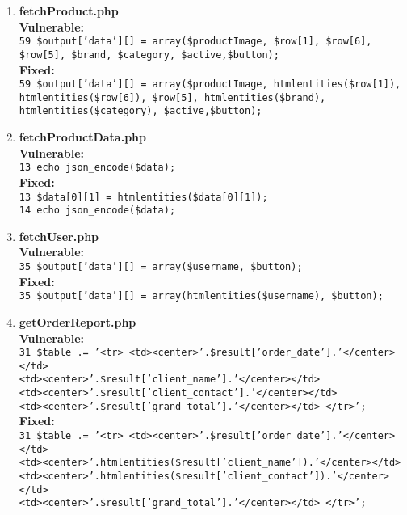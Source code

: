 \documentclass[11pt]{article}
\begin{document}
\begin{enumerate}
	\item \textbf{fetchProduct.php} \\
	\textbf{Vulnerable:} \\ 
		\texttt{59 \$output['data'][] = array(\$productImage, \$row[1], \$row[6], \$row[5],
		\$brand, \$category, \$active,\$button);} \\
	\textbf{Fixed:} \\
		\texttt{59 \$output['data'][] = array(\$productImage, htmlentities(\$row[1]), htmlentities(\$row[6]), \$row[5], htmlentities(\$brand), htmlentities(\$category), \$active,\$button);} \\



\newpage
	\item \textbf{fetchProductData.php} \\
	\textbf{Vulnerable:} \\ 
		\texttt{13 echo json\_encode(\$data);} \\
	\textbf{Fixed:} \\
		\texttt{13 \$data[0][1] = htmlentities(\$data[0][1]);} \\
		\texttt{14 echo json\_encode(\$data);} \\

	\item \textbf{fetchUser.php} \\
	\textbf{Vulnerable:} \\ 
		\texttt{35 \$output['data'][] = array(\$username, \$button);} \\
	\textbf{Fixed:} \\
		\texttt{35 \$output['data'][] = array(htmlentities(\$username), \$button);} \\

	\item \textbf{getOrderReport.php} \\
	\textbf{Vulnerable:} \\ 
		\texttt{31 \$table .= '<tr>
        <td><center>'.\$result['order\_date'].'</center></td>} \\
        \texttt{<td><center>'.\$result['client\_name'].'</center></td>} \\
        \texttt{<td><center>'.\$result['client\_contact'].'</center></td>} \\
        \texttt{<td><center>'.\$result['grand\_total'].'</center></td>
      </tr>';}\\
	\textbf{Fixed:} \\
		\texttt{31 \$table .= '<tr>
        <td><center>'.\$result['order\_date'].'</center></td>} \\
        \texttt{<td><center>'.htmlentities(\$result['client\_name']).'</center></td>} \\
        \texttt{<td><center>'.htmlentities(\$result['client\_contact']).'</center></td>} \\
        \texttt{<td><center>'.\$result['grand\_total'].'</center></td>
      </tr>';}\\



\end{enumerate}
\end{document}

